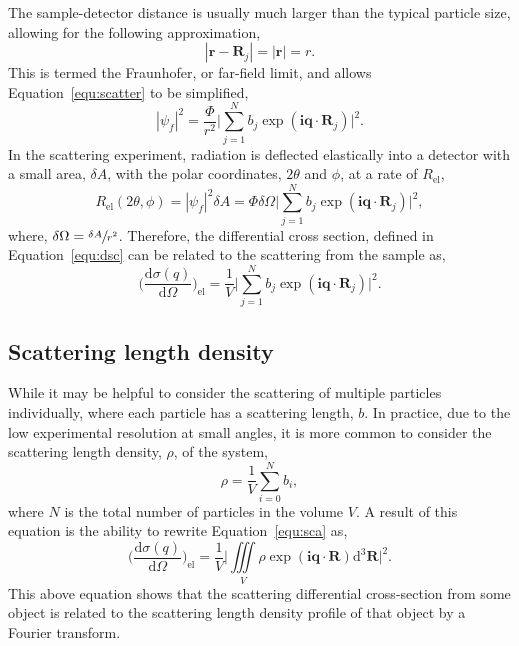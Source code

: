 The sample-detector distance is usually much larger than the typical particle size, allowing for the following approximation,
%
\begin{equation}
    |\mathbf{r} - \mathbf{R}_j| = |\mathbf{r}| = r.
\end{equation}
%
This is termed the Fraunhofer, or far-field limit, and allows Equation~\ref{equ:scatter} to be simplified,
%
\begin{equation}
    |\psi_f|^2 = \frac{\Phi}{r^2}\Bigg|\sum_{j=1}^{N}b_j\exp{(\mathbf{iq}\cdot\mathbf{R}_j)}\Bigg|^2.
\end{equation}
%
In the scattering experiment, radiation is deflected elastically into a detector with a small area, $\delta A$, with the polar coordinates, $2\theta$ and $\phi$, at a rate of $R_{\text{el}}$,
%
\begin{equation}
    R_{\text{el}}(2\theta,\phi) = |\psi_f|^2\delta A = \Phi\delta\Omega\Bigg|\sum_{j=1}^{N}b_j\exp{(\mathbf{iq}\cdot\mathbf{R}_j)}\Bigg|^2,
\end{equation}
%
where, $\delta\Omega = \sfrac{\delta A}{r^2}$.
Therefore, the differential cross section, defined in Equation~\ref{equ:dsc} can be related to the scattering from the sample as,
%
\begin{equation}
    \bigg(\frac{\text{d}\sigma(q)}{\text{d}\Omega}\bigg)_{\text{el}} = \frac{1}{V} \Bigg|\sum_{j=1}^{N}b_j\exp{(\mathbf{iq}\cdot\mathbf{R}_j)}\Bigg|^2.
    \label{equ:sca}
\end{equation}
%

\subsection{Scattering length density}
\label{sec:sld}

While it may be helpful to consider the scattering of multiple particles individually, where each particle has a scattering length, $b$.
In practice, due to the low experimental resolution at small angles, it is more common to consider the scattering length density, $\rho$, of the system,
%
\begin{equation}
    \rho = \frac{1}{V}\sum_{i=0}^{N} b_i,
\end{equation}
%
where $N$ is the total number of particles in the volume $V$.
A result of this equation is the ability to rewrite Equation~\ref{equ:sca} as,
%
\begin{equation}
    \bigg(\frac{\text{d}\sigma(q)}{\text{d}\Omega}\bigg)_{\text{el}} = \frac{1}{V} \Bigg|\iiint \limits_V \rho\exp{(\mathbf{iq}\cdot\mathbf{R})}\text{d}^3\mathbf{R}\Bigg|^2.
    \label{equ:sldsca}
\end{equation}
%
This above equation shows that the scattering differential cross-section from some object is related to the scattering length density profile of that object by a Fourier transform.

